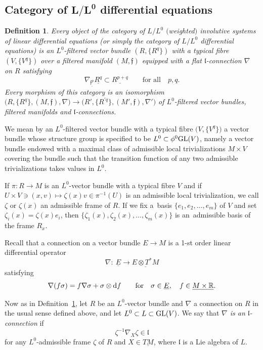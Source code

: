 \documentclass[10pt,a4paper]{amsart}
\newcommand{\R}{\mathbb R}
\newcommand{\f}{\mathfrak f}
\newcommand{\lf}{\mathfrak l}
\newtheorem{df}[thm]{Definition}
\numberwithin{equation}{section}
\begin{document}
\subsection[Category of L/L0 differential equations]
{Category of $\boldsymbol{L/L^0}$ differential equations}
\begin{df}\label{dfn3}
	Every object of \emph{the category of $L/L^0$ $($weighted$)$ involutive systems of linear differential equations} (or simply \emph{the category of $L/L^0$ differential equations}) is an $L^0$-filtered vector bundle $(R,\{R^q\})$ with a typical fibre $(V,\{V^q\})$ over a filtered manifold $(M,\f)$ equipped with a flat $\lf$-connection $\nabla$ on $R$ satisfying
	\[
		\nabla_{\underline{\f^p}} \underline{R^q}\subset \underline{R^{p+q}}\qquad
\text{for all}\quad p,q.
	\]
	Every morphism of this category is an isomorphism $\big(R, \{R^q\}, (M,\f),\nabla\big)\! \to \! \big(R', \{R^{\prime q}\}, (M',\f),\nabla'\big)$ of $L^0$-filtered vector bundles, filtered manifolds and $\lf$-connections.
\end{df}

We mean by an $L^0$-filtered vector bundle with a typical fibre $\big(V,\{V^q\}\big)$ a vector bundle whose structure group is specified to be $L^0\subset \phi^0 {\rm GL}(V)$, namely a vector bundle endowed with a maximal class of admissible local trivializations $M\times V$ covering the bundle such that the transition function of any two admissible trivializations takes values in $L^0$.

If $\pi\colon R\to M$ is an $L^0$-vector bundle with a typical fibre $V$ and if $U\times V\ni (x,v)\mapsto \zeta(x)v\in\pi^{-1}(U)$ is an admissible local trivialization, we call $\zeta$ or $\zeta(x)$ an admissible frame of $R$. If we fix a~basis $\{e_1,e_2,\dots,e_m\}$ of $V$ and set $\zeta_i(x)= \zeta(x)e_i$, then $\{\zeta_1(x),\zeta_2(x),\dots,\zeta_m(x)\}$ is an~admissible basis of the frame $R_x$.

Recall that a connection on a vector bundle $E\to M$ is a 1-st order linear differential operator
\[
\nabla \colon\ \underline{E} \to \underline{E\otimes T^*M}
\]
satisfying
\[
\nabla(f\sigma) = f\nabla\sigma + \sigma\otimes {\rm d}f\qquad \text{for}\quad
\sigma\in\underline{E},\quad f\in \underline{M\times \R}.
\]

Now as in Definition~\ref{dfn3}, let $R$ be an $L^0$-vector bundle and $\nabla$ a connection on $R$ in the usual sense defined above, and let $L^0\subset L\subset {\rm GL}(V)$. We say that \emph{$\nabla$ is an $\lf$-connection} if
\[
	\zeta^{-1}\nabla_X\zeta \in\lf
\]
for any $L^0$-admissible frame $\zeta$ of $R$ and $X\in\underline{TM}$, where $\lf$ is a Lie algebra of $L$.
\end{document}
